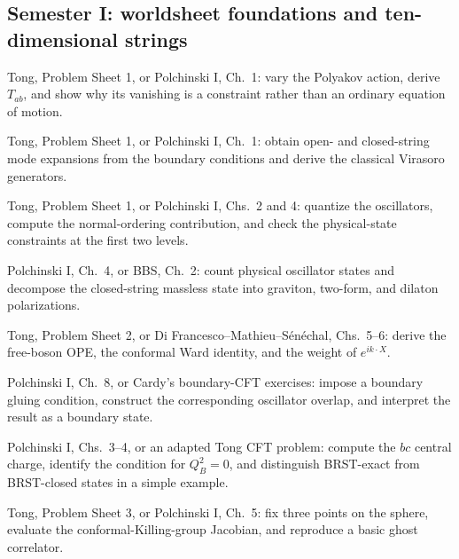\documentclass[11pt]{article}
\begin{document}
\subsection{Semester I: worldsheet foundations and ten-dimensional strings}

\begin{description}[leftmargin=2.1cm,labelwidth=1.55cm,labelsep=0.35cm,align=left,itemsep=4pt]
  \item[Week 1] Tong, Problem Sheet 1, or Polchinski I, Ch.~1: vary the Polyakov
  action, derive $T_{ab}$, and show why its vanishing is a constraint rather
  than an ordinary equation of motion.

  \item[Week 2] Tong, Problem Sheet 1, or Polchinski I, Ch.~1: obtain open- and
  closed-string mode expansions from the boundary conditions and derive the
  classical Virasoro generators.

  \item[Week 3] Tong, Problem Sheet 1, or Polchinski I, Chs.~2 and 4: quantize
  the oscillators, compute the normal-ordering contribution, and check the
  physical-state constraints at the first two levels.

  \item[Week 4] Polchinski I, Ch.~4, or BBS,
  Ch.~2: count physical oscillator states and decompose the closed-string
  massless state into graviton, two-form, and dilaton polarizations.

  \item[Week 5] Tong, Problem Sheet 2, or Di Francesco--Mathieu--S\'en\'echal,
  Chs.~5--6: derive the free-boson OPE, the conformal Ward identity, and the
  weight of $e^{ik\cdot X}$.

  \item[Week 6] Polchinski I, Ch.~8, or Cardy's boundary-CFT exercises: impose
  a boundary gluing condition, construct the corresponding oscillator overlap,
  and interpret the result as a boundary state.

  \item[Week 7] Polchinski I, Chs.~3--4, or an adapted Tong CFT problem: compute
  the $bc$ central charge, identify the condition for $Q_B^2=0$, and distinguish
  BRST-exact from BRST-closed states in a simple example.

  \item[Week 8] Tong, Problem Sheet 3, or Polchinski I, Ch.~5: fix three points
  on the sphere, evaluate the conformal-Killing-group Jacobian, and reproduce a
  basic ghost correlator.


\end{description}
\end{document}

